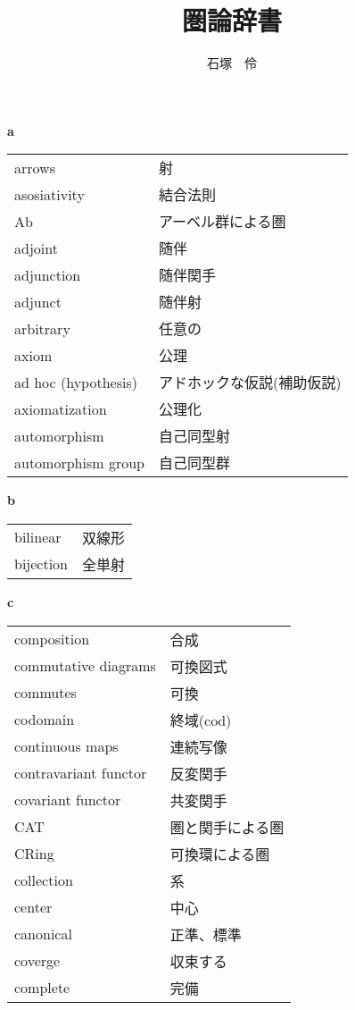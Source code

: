 \documentclass[dvipdfmx]{jsarticle}
\title{圏論辞書}
\author{石塚　伶}
\date{}
\begin{document}
\maketitle

\textbf{a}

  \begin{tabular}{ll}
    arrows & 射 \\
    asosiativity & 結合法則 \\
    Ab & アーベル群による圏 \\
    adjoint & 随伴 \\
    adjunction & 随伴関手 \\
    adjunct & 随伴射 \\
    arbitrary & 任意の \\
    axiom & 公理 \\
    ad hoc (hypothesis) & アドホックな仮説(補助仮説) \\
    axiomatization & 公理化 \\
    automorphism & 自己同型射 \\
    automorphism group & 自己同型群 \\
  \end{tabular}

\textbf{b}

  \begin{tabular}{ll}
    bilinear & 双線形 \\
    bijection & 全単射 \\
  \end{tabular}

\textbf{c}

  \begin{tabular}{ll}
    composition & 合成 \\
    commutative diagrams & 可換図式 \\
    commutes & 可換 \\
    codomain & 終域($\mathrm{cod}$) \\
    continuous maps & 連続写像 \\
    contravariant functor & 反変関手 \\
    covariant functor & 共変関手 \\
    CAT & 圏と関手による圏 \\
    CRing & 可換環による圏 \\
    collection & 系 \\
    center & 中心 \\
    canonical & 正準、標準 \\
    coverge & 収束する \\
    complete & 完備 \\
  \end{tabular}
\end{document}
